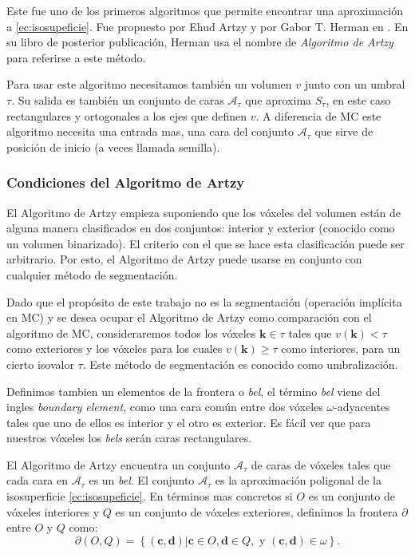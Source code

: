Este fue uno de los primeros algoritmos que permite encontrar una aproximación a \eqref{ec:isosupeficie}. Fue propuesto por Ehud Artzy y por Gabor T. Herman en \cite{artzyCorto}. En su libro \cite{Gabor:DigitalSpaces} de posterior publicación, Herman usa el nombre de \emph{Algoritmo de Artzy} para referirse a este método.

Para usar este algoritmo necesitamos también un volumen $v$ junto con un umbral $\tau$. Su salida es también un conjunto de caras $\mathcal{A}_{\tau}$ que aproxima $S_{\tau}$, en este caso rectangulares y ortogonales a los ejes que definen $v$. A diferencia de MC este algoritmo necesita una entrada mas, una cara del conjunto $\mathcal{A}_{\tau}$ que sirve de posición de inicio (a veces llamada semilla).

\subsubsection{Condiciones del Algoritmo de Artzy}

El Algoritmo de Artzy empieza suponiendo que los vóxeles del volumen están de alguna manera clasificados en dos conjuntos: interior y exterior (conocido como un volumen binarizado). El criterio con el que se hace esta clasificación puede ser arbitrario. Por esto, el Algoritmo de Artzy puede usarse en conjunto con cualquier método de segmentación.

Dado que el propósito de este trabajo no es la segmentación (operación implícita en MC) y se desea ocupar el Algoritmo de Artzy como comparación con el algoritmo de MC, consideraremos todos los vóxeles $\textbf{k} \in \tau$ tales que $v(\textbf{k}) < \tau$ como exteriores y los vóxeles para los cuales $v(\textbf{k}) \geq \tau$ como interiores, para un cierto isovalor $\tau$. Este método de segmentación es conocido como umbralización.

Definimos tambien un elementos de la frontera o \emph{bel}, el término \emph{bel} viene del ingles \emph{boundary element}, como una cara común entre dos vóxeles $\omega$-adyacentes tales que uno de ellos es interior y el otro es exterior. Es fácil ver que para nuestros vóxeles los \emph{bels} serán caras rectangulares.

El Algoritmo de Artzy encuentra un conjunto $\mathcal{A}_{\tau}$ de caras de vóxeles tales que cada cara en $\mathcal{A}_{\tau}$ es un \emph{bel}. El conjunto $\mathcal{A}_{\tau}$ es la aproximación poligonal de la isosuperficie \eqref{ec:isosupeficie}. En términos mas concretos si $O$ es un conjunto de vóxeles interiores y $Q$ es un conjunto de vóxeles exteriores, definimos la frontera $\partial$ entre $O$ y $Q$ como:
\begin{equation}
\partial (O, Q) = \left\lbrace (\textbf{c}, \textbf{d}) | \textbf{c} \in O, \textbf{d} \in Q, \text{ y } (\textbf{c}, \textbf{d}) \in \omega \right\rbrace.
\label{ec:frontera}
\end{equation}

